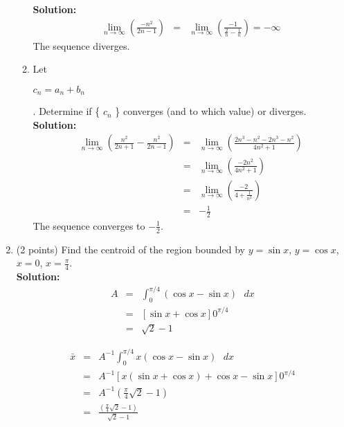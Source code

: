 \documentclass[paper=a4, fontsize=11pt]{scrartcl} %
\numberwithin{equation}{section} %
\numberwithin{figure}{section} %
\numberwithin{table}{section} %
\begin{document}
\begin{enumerate}
\begin{enumerate}
\noindent\textbf{Solution:}\\
\begin{eqnarray*}
\lim\limits_{n \rightarrow \infty} \left(\frac{-n^2}{2n-1}\right) &=& \lim\limits_{n \rightarrow \infty} \left(\frac{-1}{\frac{2}{n}-\frac{1}{n}}\right)=-\infty
\end{eqnarray*}
The sequence diverges.
\item Let \begin{large}$c_n=a_n+b_n$\end{large}. Determine if \{ $c_n$ \} converges (and to which value) or diverges.
\noindent\textbf{Solution:}\\
\begin{eqnarray*}
\lim\limits_{n \rightarrow \infty} \left(\frac{n^2}{2n+1}-\frac{n^2}{2n-1}\right) &=& \lim\limits_{n \rightarrow \infty} \left(\frac{2n^3-n^2-2n^3-n^2}{4n^2+1}\right)\\
&=& \lim\limits_{n \rightarrow \infty} \left(\frac{-2n^2}{4n^2+1}\right)\\
&=& \lim\limits_{n \rightarrow \infty} \left(\frac{-2}{4+\frac{1}{n^2}}\right)\\
&=& - \frac{1}{2}
\end{eqnarray*}
The sequence converges to $\boxed{-\frac{1}{2}}$.
\end{enumerate}

\newpage
\item (2 points) Find the centroid of the region bounded by $y= \sin x$, $y= \cos x$, $x = 0$, $x = \frac{\pi}{4}$. \\

\noindent\textbf{Solution:}\\
\begin{eqnarray*}
A &=& \int_0^{\pi/4} \left( \cos x - \sin x \right) \text{ } dx \\
&=& \left[ \sin x + \cos x \right]0^{\pi/4} \\
&=& \sqrt{2}-1
\end{eqnarray*}

\begin{eqnarray*}
\bar{x} &=& A^{-1}\int_0^{\pi/4} x \left( \cos x - \sin x \right) \text{ } dx \\
&=& A^{-1} \left[ x \left( \sin x + \cos x \right) + \cos x - \sin x \right]0^{\pi/4} \\
&=& A^{-1} \left( \frac{\pi}{4} \sqrt{2} -1\right) \\
&=& \frac{ \left( \frac{\pi}{4} \sqrt{2} -1\right)}{\sqrt{2}-1}
\end{eqnarray*}


\end{enumerate}
\end{document}
